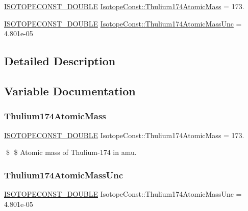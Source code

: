\begin{DoxyCompactItemize}
\item 
\mbox{\hyperlink{group___isotope_const-_macros_ga8f45a7272ce02c0b4c65c44636ed719a}{I\+S\+O\+T\+O\+P\+E\+C\+O\+N\+S\+T\+\_\+\+D\+O\+U\+B\+LE}} \mbox{\hyperlink{group___isotope_const-_thulium-_tm174_ga142642eda686c64fa86d744026f9beb7}{Isotope\+Const\+::\+Thulium174\+Atomic\+Mass}} = 173.
\item 
\mbox{\hyperlink{group___isotope_const-_macros_ga8f45a7272ce02c0b4c65c44636ed719a}{I\+S\+O\+T\+O\+P\+E\+C\+O\+N\+S\+T\+\_\+\+D\+O\+U\+B\+LE}} \mbox{\hyperlink{group___isotope_const-_thulium-_tm174_ga941fb923172ca8c0da82f4585ac073f4}{Isotope\+Const\+::\+Thulium174\+Atomic\+Mass\+Unc}} = 4.\+801e-\/05
\end{DoxyCompactItemize}


\subsection{Detailed Description}


\subsection{Variable Documentation}
\mbox{\label{group___isotope_const-_thulium-_tm174_ga142642eda686c64fa86d744026f9beb7}} 
\subsubsection{\texorpdfstring{Thulium174\+Atomic\+Mass}{Thulium174AtomicMass}}
{\footnotesize\ttfamily \mbox{\hyperlink{group___isotope_const-_macros_ga8f45a7272ce02c0b4c65c44636ed719a}{I\+S\+O\+T\+O\+P\+E\+C\+O\+N\+S\+T\+\_\+\+D\+O\+U\+B\+LE}} Isotope\+Const\+::\+Thulium174\+Atomic\+Mass = 173.}

\$ \$ Atomic mass of Thulium-\/174 in amu. \mbox{\label{group___isotope_const-_thulium-_tm174_ga941fb923172ca8c0da82f4585ac073f4}} 
\subsubsection{\texorpdfstring{Thulium174\+Atomic\+Mass\+Unc}{Thulium174AtomicMassUnc}}
{\footnotesize\ttfamily \mbox{\hyperlink{group___isotope_const-_macros_ga8f45a7272ce02c0b4c65c44636ed719a}{I\+S\+O\+T\+O\+P\+E\+C\+O\+N\+S\+T\+\_\+\+D\+O\+U\+B\+LE}} Isotope\+Const\+::\+Thulium174\+Atomic\+Mass\+Unc = 4.\+801e-\/05}

